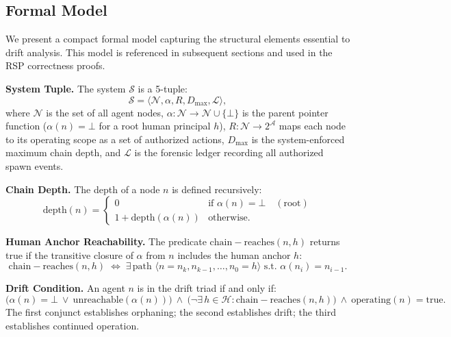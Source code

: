 \subsection{Formal Model}
\label{sec:rs-drift-model}

We present a compact formal model capturing the structural elements essential to drift analysis. This model is referenced in subsequent sections and used in the RSP correctness proofs.

\medskip
\noindent\textbf{System Tuple.}
The system $\mathcal{S}$ is a 5-tuple:
\begin{equation}
\mathcal{S} = \langle \mathcal{N}, \alpha, R, D_{\max}, \mathcal{L} \rangle,
\label{eq:system-tuple}
\end{equation}
where $\mathcal{N}$ is the set of all agent nodes, $\alpha: \mathcal{N} \rightarrow \mathcal{N} \cup \{\bot\}$ is the parent pointer function ($\alpha(n) = \bot$ for a root human principal $h$), $R: \mathcal{N} \rightarrow 2^{\mathcal{A}}$ maps each node to its operating scope as a set of authorized actions, $D_{\max}$ is the system-enforced maximum chain depth, and $\mathcal{L}$ is the forensic ledger recording all authorized spawn events.

\medskip
\noindent\textbf{Chain Depth.}
The depth of a node $n$ is defined recursively:
\begin{equation}
\mathrm{depth}(n) =
\begin{cases}
0 & \text{if } \alpha(n) = \bot \quad (\text{root}) \\
1 + \mathrm{depth}(\alpha(n)) & \text{otherwise}.
\end{cases}
\label{eq:chain-depth}
\end{equation}

\medskip
\noindent\textbf{Human Anchor Reachability.}
The predicate $\mathrm{chain-reaches}(n, h)$ returns true if the transitive closure of $\alpha$ from $n$ includes the human anchor $h$:
\begin{equation}
\mathrm{chain-reaches}(n, h) \;\iff\; \exists\, \text{path } \langle n = n_k, n_{k-1}, \ldots, n_0 = h \rangle \text{ s.t. } \alpha(n_i) = n_{i-1}.
\label{eq:chain-reaches}
\end{equation}

\medskip
\noindent\textbf{Drift Condition.}
An agent $n$ is in the drift triad if and only if:
\begin{equation}
\bigl( \alpha(n) = \bot \ \lor \ \mathrm{unreachable}(\alpha(n)) \bigr)\ \land\ \bigl( \neg\exists\, h \in \mathcal{H} : \mathrm{chain-reaches}(n, h) \bigr)\ \land\ \mathrm{operating}(n) = \mathrm{true}.
\label{eq:drift-condition}
\end{equation}
The first conjunct establishes orphaning; the second establishes drift; the third establishes continued operation.

